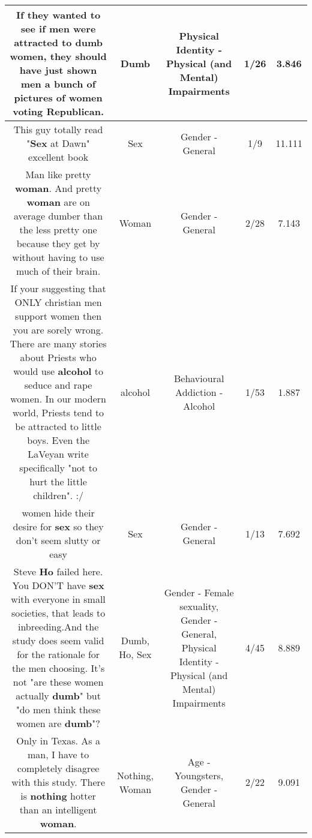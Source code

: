 \documentclass[11pt]{article}
\newlength\mylength
\begin{document}
\begin{center}
\begin{longtable}{|C{.65\mylength}|C{.30\mylength}|C{.12\mylength}|C{.12\mylength}|C{.12\mylength}|}
  \small If they wanted to see if men were attracted to \textbf{dumb} women, they should have just shown men a bunch of pictures of women voting Republican.\normalsize   & Dumb & Physical Identity - Physical (and Mental) Impairments & 1/26 & 3.846 \\  \hline
  \small This guy totally read "\textbf{Sex} at Dawn"  excellent book\normalsize   & Sex & Gender - General & 1/9 & 11.111 \\  \hline
  \small Man like pretty \textbf{woman}. And pretty \textbf{woman} are on average dumber than the less pretty one because they get by without having to use much of their brain.\normalsize   & Woman & Gender - General & 2/28 & 7.143 \\  \hline
  \small If your suggesting that ONLY christian men support women then you are sorely wrong. There are many stories about Priests who would use \textbf{alcohol} to seduce and rape women. In our modern world, Priests tend to be attracted to little boys. Even the LaVeyan write specifically "not to hurt the little children". :/\normalsize   & alcohol & Behavioural Addiction - Alcohol & 1/53 & 1.887 \\  \hline
  \small women hide their desire for \textbf{sex} so they don't seem slutty or easy\normalsize   & Sex & Gender - General & 1/13 & 7.692 \\  \hline
  \small Steve \textbf{Ho} failed here. You DON'T have \textbf{sex} with everyone in small societies, that leads to inbreeding.And the study does seem valid for the rationale for the men choosing. It's not "are these women actually \textbf{dumb}" but "do men think these women are \textbf{dumb}"?\normalsize   & Dumb, Ho, Sex & Gender - Female sexuality, Gender - General, Physical Identity - Physical (and Mental) Impairments & 4/45 & 8.889 \\  \hline
  \small Only in Texas.  As a man, I have to completely disagree with this study.  There is \textbf{nothing} hotter than an intelligent \textbf{woman}.\normalsize   & Nothing, Woman & Age - Youngsters, Gender - General & 2/22 & 9.091 \\  \hline

\end{longtable}
\end{center}
\end{document}
